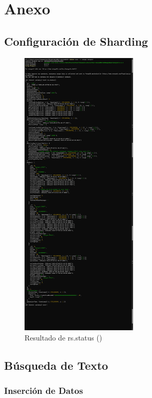 \section{Anexo}

\subsection{Configuración de Sharding}
\begin{figure}[H]
    \centering
    \includegraphics[width=0.5\textwidth]{./sharding.jpg}
    \caption{Resultado de rs.status ()}\label{fig:sharding}
\end{figure}

\subsection{Búsqueda de Texto}

\subsubsection{Inserción de Datos}\label{insercion}

